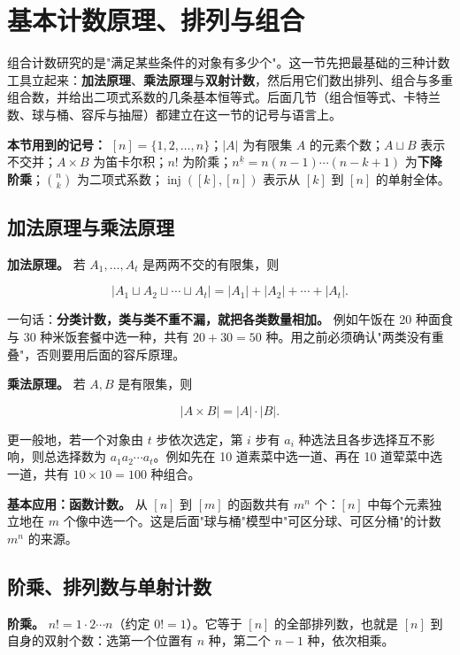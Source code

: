 \section{基本计数原理、排列与组合}


组合计数研究的是"满足某些条件的对象有多少个"。这一节先把最基础的三种计数工具立起来：\textbf{加法原理}、\textbf{乘法原理}与\textbf{双射计数}，然后用它们数出排列、组合与多重组合数，并给出二项式系数的几条基本恒等式。后面几节（组合恒等式、卡特兰数、球与桶、容斥与抽屉）都建立在这一节的记号与语言上。

\textbf{本节用到的记号：} $[n]=\{1,2,\dots,n\}$；$|A|$ 为有限集 $A$ 的元素个数；$A\sqcup B$ 表示不交并；$A\times B$ 为笛卡尔积；$n!$ 为阶乘；$n^{\underline{k}}=n(n-1)\cdots(n-k+1)$ 为\textbf{下降阶乘}；$\binom nk$ 为二项式系数；$\operatorname{inj}([k],[n])$ 表示从 $[k]$ 到 $[n]$ 的单射全体。

\subsection{加法原理与乘法原理}


\textbf{加法原理。} 若 $A_1,\dots,A_t$ 是两两不交的有限集，则

\[
|A_1\sqcup A_2\sqcup\cdots\sqcup A_t|=|A_1|+|A_2|+\cdots+|A_t|.
\]

一句话：\textbf{分类计数，类与类不重不漏，就把各类数量相加。} 例如午饭在 20 种面食与 30 种米饭套餐中选一种，共有 $20+30=50$ 种。用之前必须确认"两类没有重叠"，否则要用后面的容斥原理。

\textbf{乘法原理。} 若 $A,B$ 是有限集，则

\[
|A\times B|=|A|\cdot |B|.
\]

更一般地，若一个对象由 $t$ 步依次选定，第 $i$ 步有 $a_i$ 种选法且各步选择互不影响，则总选择数为 $a_1a_2\cdots a_t$。例如先在 10 道素菜中选一道、再在 10 道荤菜中选一道，共有 $10\times 10=100$ 种组合。

\textbf{基本应用：函数计数。} 从 $[n]$ 到 $[m]$ 的函数共有 $m^n$ 个：$[n]$ 中每个元素独立地在 $m$ 个像中选一个。这是后面"球与桶"模型中"可区分球、可区分桶"的计数 $m^n$ 的来源。

\subsection{阶乘、排列数与单射计数}


\textbf{阶乘。} $n!=1\cdot2\cdots n$（约定 $0!=1$）。它等于 $[n]$ 的全部排列数，也就是 $[n]$ 到自身的双射个数：选第一个位置有 $n$ 种，第二个 $n-1$ 种，依次相乘。

